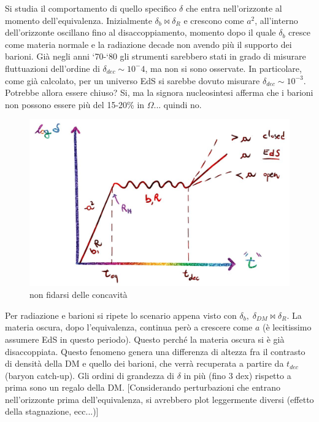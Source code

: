 \vspace{1em}
\begin{example} Si studia il comportamento di quello specifico $\delta$ che entra nell'orizzonte al momento dell'equivalenza. Inizialmente $\delta_b \bowtie \delta_R$ e crescono come $a^2$, all'interno dell'orizzonte oscillano fino al disaccoppiamento, momento dopo il quale $\delta_b$ cresce come materia normale e la radiazione decade non avendo più il supporto dei barioni. Già negli anni `70-`80 gli strumenti sarebbero stati in grado di misurare fluttuazioni dell'ordine di $\delta_{dec}\sim 10^-4$, ma non si sono osservate. In particolare, come già calcolato, per un universo EdS si sarebbe dovuto misurare $\delta_{dec}\sim 10^{-3}$. Potrebbe allora essere chiuso? Si, ma la signora nucleosintesi afferma che i barioni non possono essere più del 15-20\% in $\Omega$... quindi no.
\end{example}

\vspace*{-2em}
\begin{figure}[H]
    \centering
    \includegraphics[width=.9 \textwidth]{Pictures/6/growingfactor.jpg}
    \caption{non fidarsi delle concavità}
\end{figure}


\vspace*{-2em}
\begin{example}
Per radiazione e barioni si ripete lo scenario appena visto con $\delta_b,\; \delta_{DM} \bowtie \delta_R$. La materia oscura, dopo l'equivalenza, continua però a crescere come $a$ (è lecitissimo assumere EdS in questo periodo). Questo perché la materia oscura si è già disaccoppiata. Questo fenomeno genera una differenza di altezza fra il contrasto di densità della DM e quello dei barioni, che verrà recuperata a partire da $t_{dec}$ (baryon catch-up). Gli ordini di grandezza di $\delta$ in più (fino 3 dex) rispetto a prima sono un regalo della DM.
[Considerando perturbazioni che entrano nell'orizzonte prima dell'equivalenza, si avrebbero plot leggermente diversi (effetto della stagnazione, ecc...)]
\end{example}


